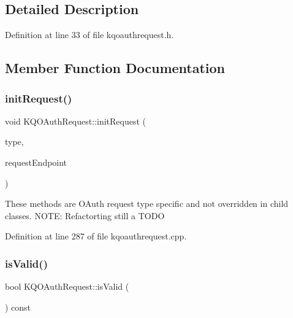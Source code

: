 \subsection{Detailed Description}


Definition at line 33 of file kqoauthrequest.\+h.



\subsection{Member Function Documentation}
\mbox{\label{class_k_q_o_auth_request_a4b045494336db124c895c387859ed5a3}} 
\subsubsection{\texorpdfstring{init\+Request()}{initRequest()}}
{\footnotesize\ttfamily void K\+Q\+O\+Auth\+Request\+::init\+Request (\begin{DoxyParamCaption}\item[{K\+Q\+O\+Auth\+Request\+::\+Request\+Type}]{type,  }\item[{const Q\+Url \&}]{request\+Endpoint }\end{DoxyParamCaption})}

These methods are O\+Auth request type specific and not overridden in child classes. N\+O\+TE\+: Refactorting still a T\+O\+DO 

Definition at line 287 of file kqoauthrequest.\+cpp.

\mbox{\label{class_k_q_o_auth_request_a6a9de60901bae594ecbd3a95a5967ed9}} 
\subsubsection{\texorpdfstring{is\+Valid()}{isValid()}}
{\footnotesize\ttfamily bool K\+Q\+O\+Auth\+Request\+::is\+Valid (\begin{DoxyParamCaption}{ }\end{DoxyParamCaption}) const\hspace{0.3cm}{\ttfamily [virtual]}}

